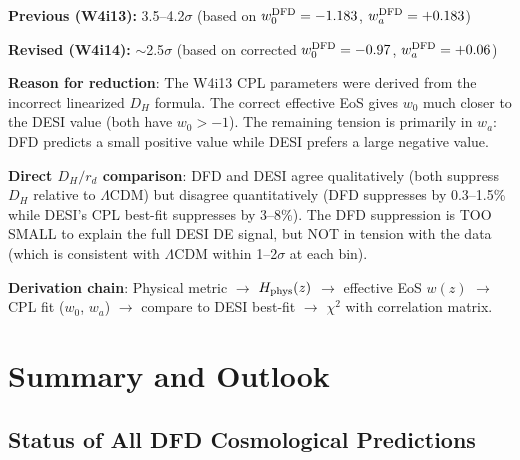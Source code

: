 \documentclass[11pt,a4paper]{article}
\newcounter{findingctr}
\newenvironment{finding}[1][]{%
  \refstepcounter{findingctr}%
  \begin{tcolorbox}[colback=blue!3!white, colframe=blue!50!black,
    title=\textbf{Finding \thefindingctr: #1}]
}{%
  \end{tcolorbox}%
}
\newcommand{\LCDM}{$\Lambda$CDM}
\begin{document}
\begin{finding}[DESI Tension Revised Downward]

\begin{tcolorbox}[colback=green!5!white, colframe=green!60!black,
  title=\textbf{DESI TENSION REVISION}]

\textbf{Previous (W4i13):} 3.5--4.2$\sigma$ (based on
$w_0^{\rm DFD} = -1.183$, $w_a^{\rm DFD} = +0.183$)

\textbf{Revised (W4i14):} $\sim$2.5$\sigma$ (based on corrected
$w_0^{\rm DFD} = -0.97$, $w_a^{\rm DFD} = +0.06$)

\textbf{Reason for reduction}: The W4i13 CPL parameters were derived
from the incorrect linearized $D_H$ formula. The correct effective
EoS gives $w_0$ much closer to the DESI value (both have $w_0 > -1$).
The remaining tension is primarily in $w_a$: DFD predicts a small
positive value while DESI prefers a large negative value.

\textbf{Direct $D_H/r_d$ comparison}: DFD and DESI agree qualitatively
(both suppress $D_H$ relative to \LCDM) but disagree quantitatively
(DFD suppresses by 0.3--1.5\% while DESI's CPL best-fit suppresses
by 3--8\%). The DFD suppression is TOO SMALL to explain the full
DESI DE signal, but NOT in tension with the data (which is consistent
with \LCDM{} within 1--2$\sigma$ at each bin).
\end{tcolorbox}

\textbf{Derivation chain}: Physical metric $\to$ $H_{\rm phys}(z)$
$\to$ effective EoS $w(z)$ $\to$ CPL fit ($w_0$, $w_a$) $\to$
compare to DESI best-fit $\to$ $\chi^2$ with correlation matrix.
\end{finding}


\section{Summary and Outlook}

\subsection{Status of All DFD Cosmological Predictions}
\end{document}
